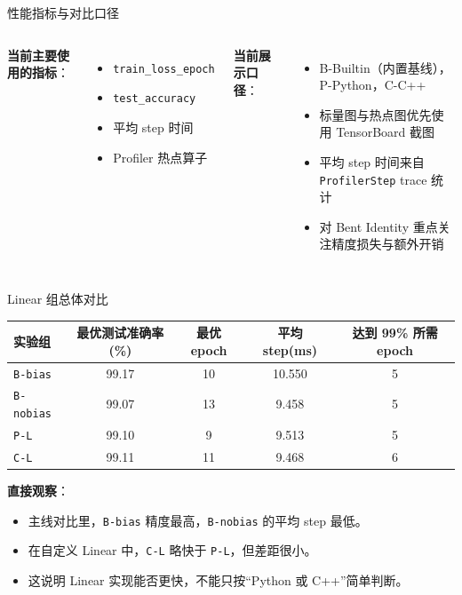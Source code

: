 \documentclass[10pt, aspectratio=169]{beamer}
\begin{document}
\begin{frame}{性能指标与对比口径}
    \begin{columns}[T,totalwidth=\textwidth]
        \textbf{当前主要使用的指标}：
        \begin{itemize}
            \item \texttt{train\_loss\_epoch}
            \item \texttt{test\_accuracy}
            \item 平均 step 时间
            \item Profiler 热点算子
        \end{itemize}

        \textbf{当前展示口径}：
        \begin{itemize}
            \item B-Builtin（内置基线），P-Python，C-C++
            \item 标量图与热点图优先使用 TensorBoard 截图
            \item 平均 step 时间来自 \texttt{ProfilerStep} trace 统计
            \item 对 Bent Identity 重点关注精度损失与额外开销
        \end{itemize}
    \end{columns}
\end{frame}

\begin{frame}{Linear 组总体对比}
    \begin{tabular}{lcccc}
        \toprule
        实验组 & 最优测试准确率(\%) & 最优 epoch & 平均 step(ms) & 达到 99\% 所需 epoch \\
        \midrule
        \texttt{B-bias} & 99.17 & 10 & 10.550 & 5 \\
        \texttt{B-nobias} & 99.07 & 13 & 9.458 & 5 \\
        \texttt{P-L} & 99.10 & 9 & 9.513 & 5 \\
        \texttt{C-L} & 99.11 & 11 & 9.468 & 6 \\
        \bottomrule
    \end{tabular}
\vspace{0.15cm}

\textbf{直接观察}：
\begin{itemize}
    \item 主线对比里，\texttt{B-bias} 精度最高，\texttt{B-nobias} 的平均 step 最低。
    \item 在自定义 Linear 中，\texttt{C-L} 略快于 \texttt{P-L}，但差距很小。
    \item 这说明 Linear 实现能否更快，不能只按“Python 或 C++”简单判断。
\end{itemize}
\end{frame}
\end{document}
